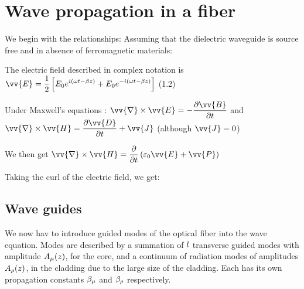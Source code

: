 \documentclass[11pt, openright]{book}
\begin{document}



    
    \newpage

     \section*{Wave propagation in a fiber}

     We begin with the relationships: 
     Assuming that the dielectric waveguide is source free and in absence of ferromagnetic materials: 

     The electric field described in complex notation is $\ds{\vv{E} =\frac{1}{2}\left[ E_0 e^{i(\omega t-\beta z)} + E_0 e^{-i(\omega t-\beta z)} \right] }$ \hfill(1.2)
     
     Under Maxwell's equations : $\ds{\vv{\nabla}\times \vv{E}=- \frac{\partial \vv{B}}{\partial t}}$ and $\ds{\vv{\nabla} \times  \vv{H}= \frac{\partial \vv{D}}{\partial t} + \vv{J}  }$ \hfill(although $\ds{\vv{J}=0}$)
     
     We then get $\ds{\vv{\nabla } \times  \vv{H} = \frac{\partial }{\partial t} \left( \varepsilon_0 \vv{E}+\vv{P} \right)  }$ 

     Taking the curl of the electric field, we get: 

      \subsection*{Wave guides}

      We now hav to introduce guided modes of the optical fiber into the wave equation. Modes are described by a summation of $\displaystyle{l}$ transverse guided modes with amplitude $\displaystyle{A_{\mu}(z)}$, for the core, and a continuum of radiation modes of amplitudes $\displaystyle{A_{\rho}(z)}$, in the cladding due to the large size of the cladding. Each has its own propagation constants $\displaystyle{\beta_{\mu}}$ and $\displaystyle{\beta_{\rho}}$ respectively. 
      
\end{document}
